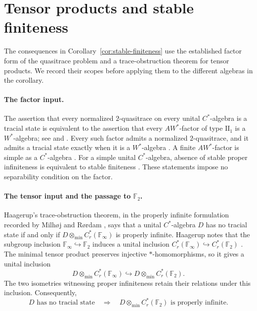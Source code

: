 \section{Tensor products and stable finiteness}
\label{sec:consequences}

The consequences in Corollary~\ref{cor:stable-finiteness} use the
established factor form of the quasitrace problem and a trace-obstruction
theorem for tensor products. We record their scopes before applying them
to the different algebras in the corollary.

\paragraph{The factor input.}
The assertion that every normalized \(2\)-quasitrace on every unital
\(C^*\)-algebra is a tracial state is equivalent to the assertion that
every \(AW^*\)-factor of type \(\mathrm{II}_1\) is a \(W^*\)-algebra;
see \cite[Section~2]{MR} and \cite[Theorem~4.11]{Gow}.
Every such factor admits
a normalized \(2\)-quasitrace, and it admits a tracial state exactly
when it is a \(W^*\)-algebra \cite[Section~2]{MR}. A finite
\(AW^*\)-factor is simple as a \(C^*\)-algebra
\cite[Remark~2.7]{Gow}. For a simple unital \(C^*\)-algebra, absence of
stable proper infiniteness is equivalent to stable finiteness
\cite[Section~2]{MR}. These statements impose no separability condition
on the factor.

\paragraph{The tensor input and the passage to \(\mathbb F_2\).}
Haagerup's trace-obstruction theorem, in the properly infinite
formulation recorded by Milh{\o}j and R{\o}rdam
\cite[Theorem~3.1]{MR}, says that a unital \(C^*\)-algebra \(D\) has no
tracial state if and only if
\(D\otimes_{\min}C_r^*(\mathbb F_\infty)\) is properly infinite.
Haagerup notes that the subgroup inclusion
\(\mathbb F_\infty\hookrightarrow\mathbb F_2\) induces a unital
inclusion \(C_r^*(\mathbb F_\infty)\hookrightarrow C_r^*(\mathbb F_2)\)
\cite[Remark~2.5(a)]{Haagerup}. The minimal tensor product preserves
injective \(*\)-homomorphisms, so it gives a unital inclusion
\[
D\otimes_{\min}C_r^*(\mathbb F_\infty)
\hookrightarrow D\otimes_{\min}C_r^*(\mathbb F_2).
\]
The two isometries witnessing proper infiniteness retain their relations
under this inclusion. Consequently,
\begin{equation}
 D\text{ has no tracial state}
 \quad\Longrightarrow\quad
 D\otimes_{\min}C_r^*(\mathbb F_2)\text{ is properly infinite}.
 \label{eq:traceless-tensor}
\end{equation}

